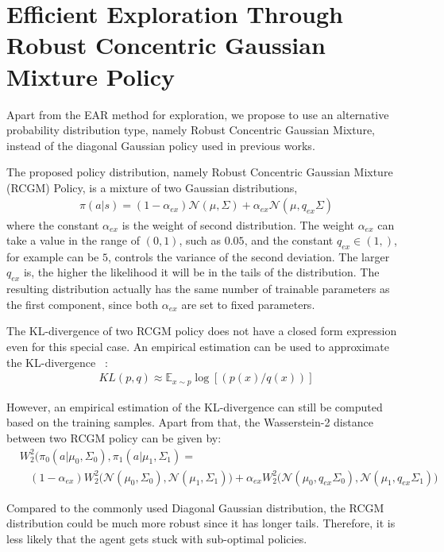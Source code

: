 \section{Efficient Exploration Through Robust Concentric Gaussian Mixture Policy}
Apart from the EAR method for exploration, we propose to use an alternative probability distribution type, namely Robust Concentric Gaussian Mixture, instead of the diagonal Gaussian policy used in previous works.

The proposed policy distribution, namely Robust Concentric Gaussian Mixture (RCGM) Policy, is a mixture of two Gaussian distributions,
\begin{align}
\pi (a|s) = (1-\alpha_{ex})\mathcal{N}(\mu,\Sigma) + \alpha_{ex} \mathcal{N}(\mu,q_{ex}\Sigma)
\end{align}
where the constant $\alpha_{ex}$ is the weight of second distribution. The weight $\alpha_{ex}$ can take a value in the range of $(0,1)$, such as $0.05$, and the constant $q_{ex} \in (1,)$, for example can be $5$, controls the variance of the second deviation. The larger $q_{ex}$ is, the higher the likelihood it will be in the tails of the distribution. The resulting distribution actually has the same number of trainable parameters as the first component, since both $\alpha_{ex}$ are set to fixed parameters.

The KL-divergence of two RCGM policy does not have a closed form expression even for this special case. An empirical estimation can be used to approximate the KL-divergence ~\cite{hershey2007approximat}:
\begin{align}
KL(p, q) \approx\mathbb{E}_{x\sim p} \log [ \left(p(x)/q(x)\right) ]
\end{align}

However, an empirical estimation of the KL-divergence can still be computed based on the training samples. Apart from that, the Wasserstein-2 distance between two RCGM policy can be given by:
\begin{align}&W_2^2(\pi_{0}(a|\mu_0,\Sigma_0), \pi_{1}(a|\mu_1,\Sigma_1) =  \\ \nonumber
& \ \ \ \ (1-\alpha_{ex})
W_2^2\big(\mathcal{N}(\mu_0,\Sigma_0), \mathcal{N}(\mu_1,\Sigma_1)\big)
+ \alpha_{ex} W_2^2\big(\mathcal{N}(\mu_0,q_{ex}\Sigma_0), \mathcal{N}(\mu_1,q_{ex}\Sigma_1)\big)
\end{align}


Compared to the commonly used Diagonal Gaussian distribution, the RCGM distribution could be much more robust since it has longer tails. Therefore, it is less likely that the agent gets stuck with sub-optimal policies.

